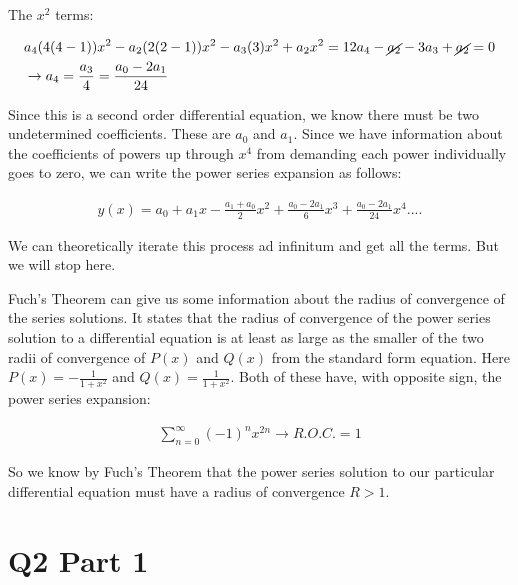 \documentclass[paper=a4, fontsize=11pt]{scrartcl} %
\numberwithin{equation}{section} %
\numberwithin{figure}{section} %
\numberwithin{table}{section} %
\begin{document}
The $x^2$ terms:

\begin{align}
&a_4(4(4-1))x^2 - a_2(2(2-1))x^2 - a_3(3)x^2 + a_2 x^2 = 12a_4 - \cancel{a_2} - 3a_3 + \cancel{a_2} = 0 \\
&\rightarrow a_4 = \frac{a_3}{4} = \frac{a_0 - 2a_1}{24} 
\end{align}



Since this is a second order differential equation, we know there must be two undetermined coefficients. These are $a_0$ and $a_1$. Since we have information about the coefficients of powers up through $x^4$ from demanding each power individually goes to zero, we can write the power series expansion as follows:

\begin{align}
y(x) = a_0 + a_1 x - \frac{a_1 + a_0}{2} x^2 + \frac{a_0 - 2a_1}{6}x^3 + \frac{a_0 - 2a_1}{24}x^4 ....
\end{align}

We can theoretically iterate this process ad infinitum and get all the terms. But we will stop here.

\hspace{2mm}

Fuch's Theorem can give us some information about the radius of convergence of the series solutions. It states that the radius of convergence of the power series solution to a differential equation is at least as large as the smaller of the two radii of convergence of $P(x)$ and $Q(x)$ from the standard form equation. Here $P(x) = -\frac{1}{1 + x^2}$ and $Q(x) = \frac{1}{1+x^2}$. Both of these have, with opposite sign, the power series expansion:

\begin{align}
\sum_{n=0}^{\infty}(-1)^n x^{2n} \rightarrow R.O.C. = 1
\end{align}

So we know by Fuch's Theorem that the power series solution to our particular differential equation must have a radius of convergence $R>1$.

\section{Q2 Part 1}
\end{document}
